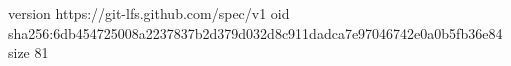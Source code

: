version https://git-lfs.github.com/spec/v1
oid sha256:6db454725008a2237837b2d379d032d8c911dadca7e97046742e0a0b5fb36e84
size 81
